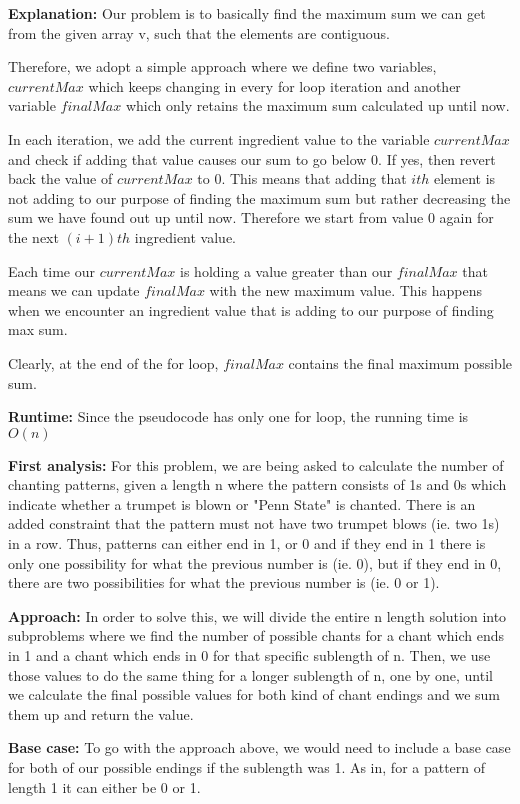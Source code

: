 \documentclass[letterpaper,11pt]{article}
\newcounter{problemid}\stepcounter{problemid}
\def\newproblem{\vspace*{0.5cm}{\bf Problem~\arabic{problemid}\stepcounter{problemid}}\hfill\fbox{\parbox{0.16\textwidth}{\bf Points:}}\par}
\begin{document}
{\bf Explanation: }
Our problem is to basically find the maximum sum we can get from the given array v, such that the elements are contiguous. 

Therefore, we adopt a simple approach where we define two variables, $currentMax$ which keeps changing in every for loop iteration and another variable $finalMax$ which only retains the maximum sum calculated up until now. 

In each iteration, we add the current ingredient value to the variable $currentMax$ and check if adding that value causes our sum to go below 0. If yes, then revert back the value of $currentMax$ to 0. This means that adding that $ith$ element is not adding to our purpose of finding the maximum sum but rather decreasing the sum we have found out up until now. Therefore we start from value 0 again for the next $(i+1)th$ ingredient value.

Each time our $currentMax$ is holding a value greater than our $finalMax$ that means we can update $finalMax$ with the new maximum value. This happens when we encounter an ingredient value that is adding to our purpose of finding max sum. 

Clearly, at the end of the for loop, $finalMax$ contains the final maximum possible sum.

{\bf Runtime: }
Since the pseudocode has only one for loop, the running time is $O(n)$

\newproblem
{\bf First analysis: }
For this problem, we are being asked to calculate the number of chanting patterns, given a length n where the pattern consists of 1s and 0s which indicate whether a trumpet is blown or "Penn State" is chanted. There is an added constraint that the pattern must not have two trumpet blows (ie. two 1s) in a row. Thus, patterns can either end in 1, or 0 and if they end in 1 there is only one possibility for what the previous number is (ie. 0), but if they end in 0, there are two possibilities for what the previous number is (ie. 0 or 1).

{\bf Approach: } In order to solve this, we will divide the entire n length solution into subproblems where we find the number of possible chants for a chant which ends in 1 and a chant which ends in 0 for that specific sublength of n. Then, we use those values to do the same thing for a longer sublength of n, one by one, until we calculate the final possible values for both kind of chant endings and we sum them up and return the value. 

{\bf Base case: } To go with the approach above, we would need to include a base case for both of our possible endings if the sublength was 1. As in, for a pattern of length 1 it can either be 0 or 1.
\end{document}
